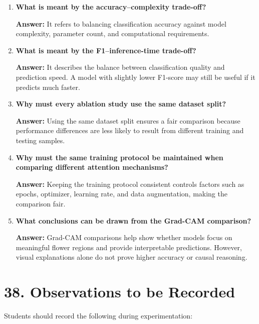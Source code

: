 \documentclass[10pt]{article}
\begin{document}
\begin{enumerate}
\item \textbf{What is meant by the accuracy--complexity trade-off?}

\textbf{Answer:} It refers to balancing classification accuracy against model complexity, parameter count, and computational requirements.

\item \textbf{What is meant by the F1--inference-time trade-off?}

\textbf{Answer:} It describes the balance between classification quality and prediction speed. A model with slightly lower F1-score may still be useful if it predicts much faster.

\item \textbf{Why must every ablation study use the same dataset split?}

\textbf{Answer:} Using the same dataset split ensures a fair comparison because performance differences are less likely to result from different training and testing samples.

\item \textbf{Why must the same training protocol be maintained when comparing different attention mechanisms?}

\textbf{Answer:} Keeping the training protocol consistent controls factors such as epochs, optimizer, learning rate, and data augmentation, making the comparison fair.

\item \textbf{What conclusions can be drawn from the Grad-CAM comparison?}

\textbf{Answer:} Grad-CAM comparisons help show whether models focus on meaningful flower regions and provide interpretable predictions. However, visual explanations alone do not prove higher accuracy or causal reasoning.

\end{enumerate}

\section*{38. Observations to be Recorded}

Students should record the following during experimentation:
\end{document}
